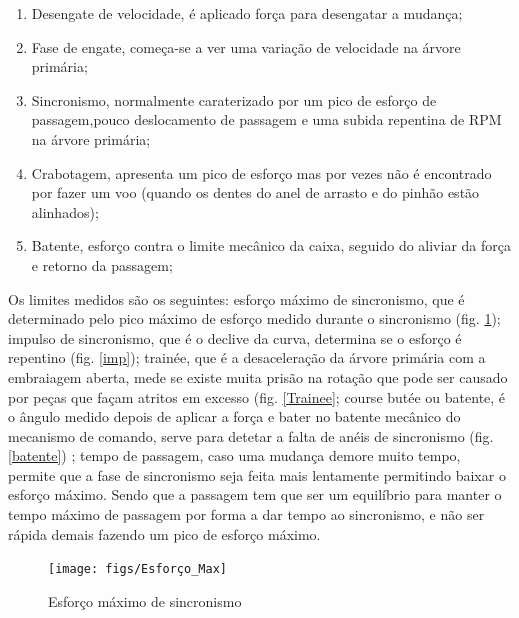 \begin{enumerate}
\item Desengate de velocidade, é aplicado força para desengatar a mudança;
\item Fase de engate, começa-se a ver uma variação de velocidade na árvore primária;
\item Sincronismo, normalmente caraterizado por um pico de esforço de passagem,pouco deslocamento de passagem e uma subida repentina de RPM na árvore primária;
\item Crabotagem, apresenta um pico de esforço mas por vezes  não é encontrado por fazer um voo (quando os dentes do anel de arrasto e do pinhão estão alinhados);
\item Batente, esforço contra o limite mecânico da caixa, seguido do aliviar da força e retorno da passagem;
\end{enumerate}

Os limites medidos são os seguintes: esforço máximo de sincronismo, que é determinado pelo pico  máximo de esforço medido durante o sincronismo (fig. \ref{esforço}); impulso de sincronismo, que é o declive da curva, determina se o esforço é repentino (fig. \ref{imp}); trainée, que é a desaceleração da árvore primária com a embraiagem aberta, mede se existe muita prisão na rotação que pode ser causado por peças que façam atritos em excesso (fig. \ref{Trainee}; course butée ou batente, é o ângulo medido depois de aplicar a força e bater no batente mecânico do mecanismo de comando, serve para detetar a falta de anéis de sincronismo (fig. \ref{batente}) ; tempo de passagem, caso uma mudança demore muito tempo, permite que a
fase de sincronismo seja feita mais lentamente permitindo baixar o esforço máximo. Sendo que a passagem tem que ser um equilíbrio para manter o tempo máximo de passagem por forma a dar tempo ao sincronismo, e não ser rápida demais fazendo um pico de esforço máximo.


\begin{figure}[H]
\centering
\texttt{[image: figs/Esforço\_Max]}
\caption{Esforço máximo de sincronismo \cite{passagemMud}}\label{esforço}
\end{figure}


